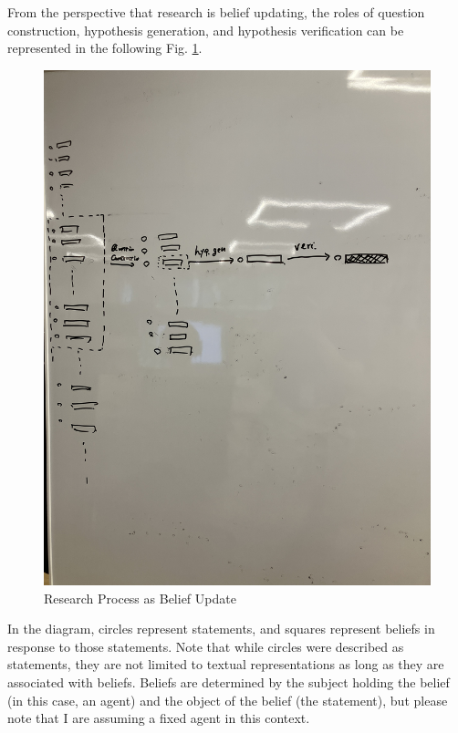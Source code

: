 \documentclass{article}
\begin{document}
From the perspective that research is belief updating, the roles of question construction, hypothesis generation, and hypothesis verification can be represented in the following Fig. \ref{fig:beliefupdate}. 
\begin{figure}[htb]
    \centering
    \includegraphics[width=\textwidth]{figs/beliefupdate.jpg}
    \caption{Research Process as Belief Update}
    \label{fig:beliefupdate}
\end{figure}
In the diagram, circles represent statements, and squares represent beliefs in response to those statements. Note that while circles were described as statements, they are not limited to textual representations as long as they are associated with beliefs. Beliefs are determined by the subject holding the belief (in this case, an agent) and the object of the belief (the statement), but please note that I are assuming a fixed agent in this context.
\end{document}

